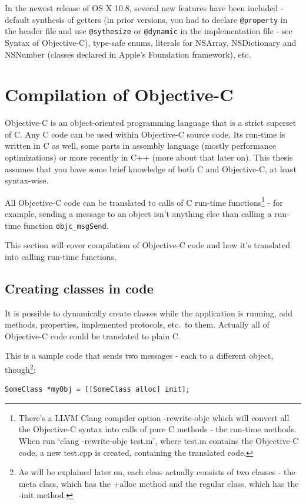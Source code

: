 \documentclass[a4paper, 11pt, fleqn]{book}
\begin{document}
In the newest release of OS X 10.8, several new features have been included - default synthesis of getters (in prior versions, you had to declare \verb=@property= in the header file and use \verb=@sythesize= or \verb=@dynamic= in the implementation file - see Syntax of Objective-C), type-safe enums, literals for NSArray, NSDictionary and NSNumber (classes declared in Apple's Foundation framework), etc.

\section{Compilation of Objective-C}

Objective-C is an object-oriented programming language that is a strict superset of C. Any C code can be used within Objective-C source code. Its run-time is written in C as well, some parts in assembly language (mostly performance optimizations) or more recently in C++ (more about that later on). This thesis assumes that you have some brief knowledge of both C and Objective-C, at least syntax-wise.


All Objective-C code can be translated to calls of C run-time functions\footnote{There's a LLVM Clang compiler option -rewrite-objc which will convert all the Objective-C syntax into calls of pure C methods - the run-time methods. When run `clang -rewrite-objc test.m', where test.m contains the Objective-C code, a new test.cpp is created, containing the translated code.} - for example, sending a message to an object isn't anything else than calling a run-time function \verb=objc_msgSend=.

This section will cover compilation of Objective-C code and how it's translated into calling run-time functions.

\subsection{Creating classes in code}

It is possible to dynamically create classes while the application is running, add methods, properties, implemented protocols, etc.\ to them. Actually all of Objective-C code could be translated to plain C.

This is a sample code that sends two messages - each to a different object, though\footnote{As will be explained later on, each class actually consists of two classes - the meta class, which has the +alloc method and the regular class, which has the -init method.}:
\begin{verbatim}SomeClass *myObj = [[SomeClass alloc] init];\end{verbatim}
\end{document}
